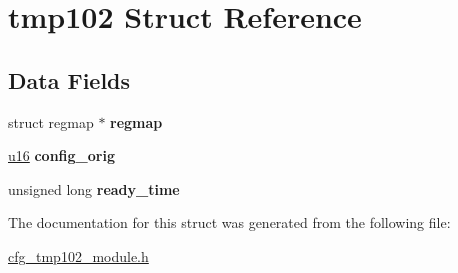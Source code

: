 \hypertarget{structtmp102}{}\section{tmp102 Struct Reference}
\label{structtmp102}
\subsection*{Data Fields}
\begin{DoxyCompactItemize}
\item 
\mbox{\label{structtmp102_a60321438eb4a38b6c427958508e13078}} 
struct regmap $\ast$ {\bfseries regmap}
\item 
\mbox{\label{structtmp102_ac8d21b2ae609c5e93c4d2ce1a989172a}} 
\hyperlink{cfg__tmp102__module_8h_ace9d960e74685e2cd84b36132dbbf8aa}{u16} {\bfseries config\+\_\+orig}
\item 
\mbox{\label{structtmp102_ab2d00c6d0d287442279fb6584567b33f}} 
unsigned long {\bfseries ready\+\_\+time}
\end{DoxyCompactItemize}


The documentation for this struct was generated from the following file\+:\begin{DoxyCompactItemize}
\item 
\hyperlink{cfg__tmp102__module_8h}{cfg\+\_\+tmp102\+\_\+module.\+h}\end{DoxyCompactItemize}
